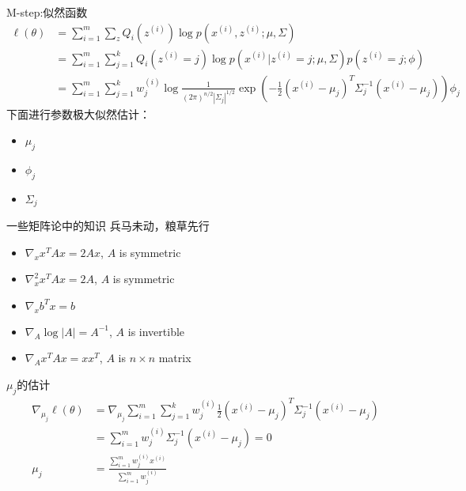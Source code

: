 \documentclass[noindent]{beamer}
\begin{document}
\begin{frame}
\alert{M-step:}似然函数
\begin{equation}
\begin{split}
    \ell(\theta) &= \sum_{i=1}^{m}  \sum _{z}Q_{i}(z^{(i)}) \log p(x^{(i)},z^{(i)}; \mu , \Sigma ) \\
              &= \sum_{i=1}^{m}  \sum _{j=1}^{k}Q_{i}(z^{(i)}=j) \log p(x^{(i)}|z^{(i)}=j; \mu , \Sigma ) p(z^{(i)}=j; \phi ) \\
              &= \sum_{i=1}^{m}  \sum _{j=1}^{k}w^{(i)}_{j} \log \frac{1}{(2\pi)^{n/2}| \Sigma _j|^{1/2}} \exp(-\frac{1}{2}(x^{(i)}-\mu_j)^T\Sigma_j^{-1}(x^{(i)}-\mu_j))\phi_j 
\end{split}
\end{equation}
下面进行参数极大似然估计：
\begin{itemize}
\item $\mu_j$
\item $\phi_j$
\item $\Sigma_j$
\end{itemize}
\end{frame}

\begin{frame}{一些矩阵论中的知识}
兵马未动，粮草先行
\begin{itemize}
\item $ \nabla_x x^T A x = 2Ax$, $A$ is symmetric
\item $ \nabla_x^2 x^TAx = 2A$, $A$ is symmetric
\item $ \nabla_x b^T x = b$
\item $ \nabla_A \log|A| = A^{-1}$, $A$ is invertible
\item $ \nabla_A x^T A x = x x^T$, $A$ is $n \times n$ matrix
\end{itemize}
\end{frame}

\begin{frame}{$\mu_j$的估计}
\begin{equation}
    \begin{split}
       \nabla _{\mu_j} \ell(\theta) &= \nabla _{\mu_j} \sum_{i=1}^m  \sum_{j=1}^k w_j^{(i)}\frac{1}{2}(x^{(i)}-\mu_j)^T  \Sigma _j^{-1}(x^{(i)}-\mu_j) \\
                                  &=  \sum_{i=1}^m w_j^{(i)} \Sigma_j^{-1}(x^{(i)}-\mu_j) = 0\\
                            \mu_j &= \frac{\sum_{i=1}^m w_j^{(i)}x^{(i)}}{\sum_{i=1}^m w_j^{(i)}}
    \end{split}
\end{equation}
\end{frame}
\end{document}
